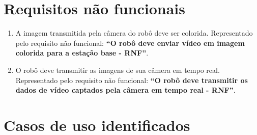 \section{Requisitos não funcionais}

\begin{enumerate}[topsep=0pt, partopsep=0pt, itemsep=0pt]
  \item A imagem transmitida pela câmera do robô deve ser colorida. Representado pelo requisito não funcional: \textbf{``O robô deve enviar vídeo em imagem colorida para a estação base - RNF''}.
  \item O robô deve transmitir as imagens de sua câmera em tempo real. Representado pelo requisito não funcional: \textbf{``O robô deve transmitir os dados de vídeo captados pela câmera em tempo real - RNF''}.
\end{enumerate}


\section{Casos de uso identificados}

